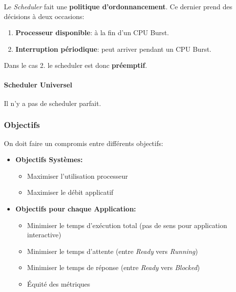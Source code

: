 Le \emph{Scheduler} fait une \textbf{politique d'ordonnancement}. Ce
dernier prend des décisions à deux occasions:

\begin{enumerate}
\def\labelenumi{\arabic{enumi}.}
\tightlist
\item
  \textbf{Processeur disponible}: à la fin d'un CPU Burst.
\item
  \textbf{Interruption périodique}: peut arriver pendant un CPU Burst.
\end{enumerate}

Dans le cas 2. le scheduler est donc \textbf{préemptif}.

\paragraph{Scheduler Universel}\label{scheduler-universel}

Il n'y a pas de scheduler parfait.

\subsubsection{Objectifs}\label{objectifs}

On doit faire un compromis entre différents objectifs:

\begin{itemize}
\tightlist
\item
  \textbf{Objectifs Systèmes:}

  \begin{itemize}
  \tightlist
  \item
    Maximiser l'utilisation processeur
  \item
    Maximiser le débit applicatif
  \end{itemize}
\item
  \textbf{Objectifs pour chaque Application:}

  \begin{itemize}
  \tightlist
  \item
    Minimiser le temps d'exécution total (pas de sens pour application
    interactive)
  \item
    Minimiser le temps d'attente (entre \emph{Ready} vers
    \emph{Running})
  \item
    Minimiser le temps de réponse (entre \emph{Ready} vers
    \emph{Blocked})
  \item
    Équité des métriques
  \end{itemize}
\end{itemize}

